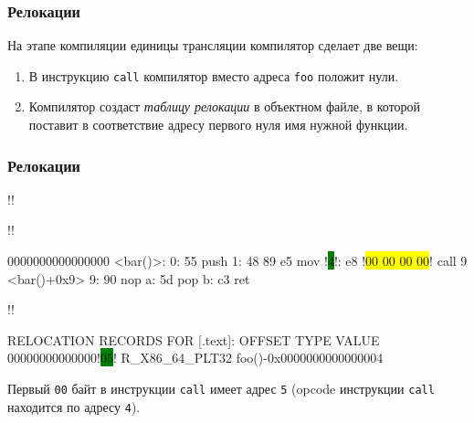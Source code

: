 \documentclass[compress, 10pt, aspectratio=169]{beamer}
\begin{document}
\begin{frame}[fragile]

    \frametitle{Релокации}

    На этапе компиляции единицы трансляции компилятор сделает две вещи:

    \begin{enumerate}

        \item В инструкцию \texttt{call} компилятор
            вместо адреса \texttt{foo} положит нули.

        \item Компилятор создаст \textit{таблицу релокации}
            в объектном файле,
            в которой поставит в соответствие адресу
            первого нуля имя нужной функции.

    \end{enumerate}

\end{frame}

\begin{frame}[fragile]
  
    \frametitle{Релокации}

    \begin{terminalwindow}
!!

!!

0000000000000000 <bar()>:
   0:   55                      push   %
   1:   48 89 e5                mov    %
   !\colorbox{green}{4}!:  e8 !\colorbox{yellow}{00 00 00 00}!        call   9 <bar()+0x9>
   9:   90                      nop
   a:   5d                      pop    %
   b:   c3                      ret

!!

RELOCATION RECORDS FOR [.text]:
OFFSET           TYPE              VALUE
00000000000000!\colorbox{green}{05}! R_X86_64_PLT32   foo()-0x0000000000000004
    \end{terminalwindow}

    Первый \texttt{00} байт в инструкции \texttt{call} имеет адрес \texttt{5}
    (opcode инструкции \texttt{call} находится по адресу \texttt{4}).

\end{frame}
\end{document}
